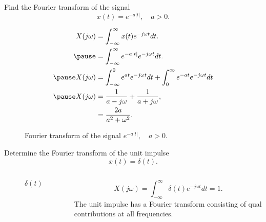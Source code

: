 \begin{frame}
    \begin{example}
        Find the Fourier transform of the signal
        \begin{equation*}
            x(t) = e^{-a|t|}, \quad a> 0.
        \end{equation*}
    \end{example}
    \pause
    {
        \begin{equation*}
            \begin{aligned}
                X(j\omega) &= \int_{-\infty}^{\infty}x(t)e^{-j\omega t} dt.\\ \pause
                &= \int_{-\infty}^{\infty} e^{-a|t|} e^{-j\omega t} dt.\\ \pause
                X(j\omega) &= \int_{-\infty}^{0} e^{at}e^{-j\omega t}dt + \int_{0}^{\infty} e^{-at}e^{-j\omega t}dt\\ \pause
                X(j\omega) &= \frac{1}{a-j\omega} + \frac{1}{a+j\omega},\\
                &= \frac{2a}{a^2+\omega^2}.
            \end{aligned}
        \end{equation*}
    }
\end{frame}

\begin{frame}[plain]
    {
        \begin{figure}
          \centering
          
          \caption{Fourier transform of the signal $e^{-a|t|}, \quad a> 0$.}\label{fi:eat}
        \end{figure}
    }
\end{frame}




\begin{frame}
    \begin{example}
        Determine the Fourier transform of the unit impulse
        \begin{equation*}
            x(t) = \delta(t).
        \end{equation*}
    \end{example}
    \pause    
    {
        \begin{columns}
                {
                    \begin{figure}
                      \centering
                      
                      \caption{$\delta(t)$}\label{fi:unit_impulse}
                    \end{figure}
                }
                \pause
                \begin{equation*}
                    X(j\omega) = \int_{-\infty}^{\infty} \delta(t)e^{-j\omega t} dt = 1.
                \end{equation*}
                The unit impulse has a Fourier transform consisting of qual contributions at all frequencies.
        \end{columns}
    }    
\end{frame}


